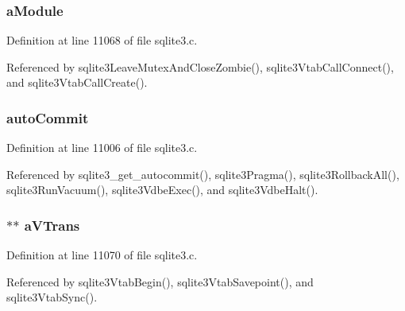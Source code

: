 \hypertarget{structsqlite3_a7471beeaa8ac13b4749adf06b3fded77}{}
\subsubsection[{a\+Module}]{ a\+Module}\label{structsqlite3_a7471beeaa8ac13b4749adf06b3fded77}


Definition at line 11068 of file sqlite3.\+c.



Referenced by sqlite3\+Leave\+Mutex\+And\+Close\+Zombie(), sqlite3\+Vtab\+Call\+Connect(), and sqlite3\+Vtab\+Call\+Create().

\hypertarget{structsqlite3_acd4770c9f1a334df0c74d6ec2bc07b5e}{}
\subsubsection[{auto\+Commit}]{ auto\+Commit}\label{structsqlite3_acd4770c9f1a334df0c74d6ec2bc07b5e}


Definition at line 11006 of file sqlite3.\+c.



Referenced by sqlite3\+\_\+get\+\_\+autocommit(), sqlite3\+Pragma(), sqlite3\+Rollback\+All(), sqlite3\+Run\+Vacuum(), sqlite3\+Vdbe\+Exec(), and sqlite3\+Vdbe\+Halt().

\hypertarget{structsqlite3_a6a037bba4ae53bf332e84cadee762b1c}{}
\subsubsection[{a\+V\+Trans}]{$\ast$$\ast$ a\+V\+Trans}\label{structsqlite3_a6a037bba4ae53bf332e84cadee762b1c}


Definition at line 11070 of file sqlite3.\+c.



Referenced by sqlite3\+Vtab\+Begin(), sqlite3\+Vtab\+Savepoint(), and sqlite3\+Vtab\+Sync().

\hypertarget{structsqlite3_ab5dd93304a04c128745b00905dfb8cdc}{}
